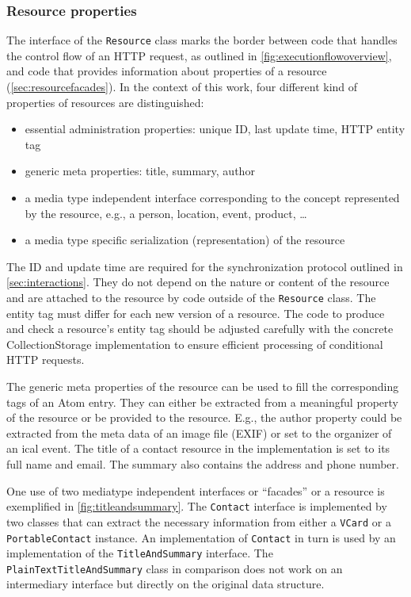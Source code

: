 \documentclass[11pt,a4paper,headsepline,twoside]{scrartcl}		%
\begin{document}
\subsubsection{Resource properties}
\label{sec:resource-properties}

The interface of the \lstinline:Resource: class marks the border between code
that handles the control flow of an HTTP request, as outlined in
\autoref{fig:executionflowoverview}, and code that provides information about
properties of a resource (\autoref{sec:resourcefacades}). In the context of this
work, four different kind of properties of resources are distinguished:

\begin{itemize}
\item essential administration properties: unique ID, last update time, HTTP
  entity tag
\item generic meta properties: title, summary, author
\item a media type independent interface corresponding to the concept represented
  by the resource, e.g., a person, location, event, product, \ldots
\item a media type specific serialization (representation) of the resource
\end{itemize}

The ID and update time are required for the synchronization protocol outlined in
\autoref{sec:interactions}. They do not depend on the nature or content of the
resource and are attached to the resource by code outside of the
\lstinline:Resource: class. The entity tag must differ for each new version of a
resource. The code to produce and check a resource's entity tag should be
adjusted carefully with the concrete CollectionStorage implementation to ensure
efficient processing of conditional HTTP requests.

The generic meta properties of the resource can be used to fill the
corresponding tags of an Atom entry. They can either be extracted from a
meaningful property of the resource or be provided to the resource. E.g., the
author property could be extracted from the meta data of an image file (EXIF) or
set to the organizer of an ical event. The title of a contact resource in the
implementation is set to its full name and email. The summary also contains the
address and phone number.

One use of two mediatype independent interfaces or ``facades'' or a resource is
exemplified in \autoref{fig:titleandsummary}. The \lstinline:Contact: interface
is implemented by two classes that can extract the necessary information from
either a \lstinline:VCard: or a \lstinline:PortableContact: instance. An
implementation of \lstinline:Contact: in turn is used by an implementation of
the \lstinline:TitleAndSummary: interface. The
\lstinline:PlainTextTitleAndSummary: class in comparison does not work on an
intermediary interface but directly on the original data structure.
\end{document}
